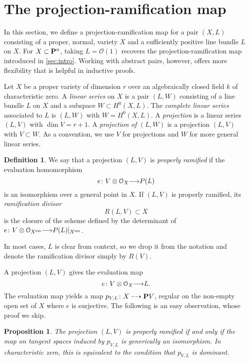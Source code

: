 \documentclass[11pt,reqno]{amsart}
\theoremstyle{plain}
\newtheorem{proposition}[theorem]{Proposition}
\theoremstyle{definition}
\newtheorem{definition}[theorem]{Definition}
\theoremstyle{remark}
\numberwithin{equation}{section}
\renewcommand{\to}{{\longrightarrow}}
\numberwithin{equation}{section}
\renewcommand{\O}{\mathcal O}
\begin{document}
\section{The projection-ramification map}\label{sec:prmap}
In this section, we define a projection-ramification map for a pair $(X, L)$ consisting of a proper, normal, variety $X$ and a sufficiently positive line bundle $L$ on $X$.
For $X \subset \P^n$, taking $L = \O(1)$ recovers the projection-ramification map introduced in \autoref{sec:intro}.
Working with abstract pairs, however, offers more flexibility that is helpful in inductive proofs.

Let $X$ be a proper variety of dimension $r$ over an algebraically closed field $k$ of characteristic zero.
A \emph{linear series} on $X$ is a pair $(L, W)$ consisting of a line bundle $L$ on $X$ and a subspace $W \subset H^0(X, L)$.
The \emph{complete linear series} associated to $L$ is $(L, W)$ with $W = H^0(X, L)$.
A \emph{projection} is a linear series $(L, V)$ with $\dim V = r+1$.
A \emph{projection of $(L, W)$} is a projection $(L, V)$ with $V \subset W$.
As a convention, we use $V$ for projections and $W$ for more general linear series.

\begin{definition}  \label{definition:properlyramified}
We say that a projection $(L,V)$ is \emph{properly ramified} if the evaluation homomorphism
\[e \from V \otimes \O_{X} \to P(L)\]
is an isomorphism over a general point in $X$.  If $(L,V)$ is properly ramified, its \emph{ramification divisor}
\[R(L,V) \subset X\]
is the closure of the scheme defined by the determinant of $e \from V \otimes \O_{X^{\rm sm}} \to P(L)|_{X^{\rm sm}}$.
\end{definition}
In most cases, $L$ is clear from context, so we drop it from the notation and denote the ramification divisor simply by $R(V)$.

A projection $(L, V)$ gives the evaluation map
\[e \from V \otimes \O_X \to L.\]
The evaluation map yields a map $p_{V,L} \from X \dashrightarrow \P V$, regular on the non-empty open set of $X$ where $e$ is surjective.
The following is an easy observation, whose proof we skip.
\begin{proposition}\label{prop:proj}
  The projection $(L, V)$ is properly ramified if and only if the map on tangent spaces induced by $p_{V,L}$ is generically an isomorphism.
  In characteristic zero, this is equivalent to the condition that $p_{V,L}$ is dominant.
\end{proposition}
\end{document}
